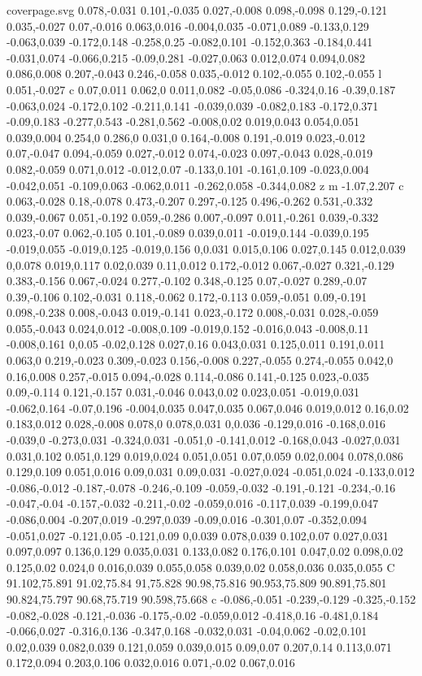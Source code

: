 \begin{filecontents}[noheader]{coverpage.svg}
0.078,-0.031 0.101,-0.035 0.027,-0.008 0.098,-0.098 0.129,-0.121 0.035,-0.027 0.07,-0.016 0.063,0.016 -0.004,0.035 -0.071,0.089 -0.133,0.129 -0.063,0.039 -0.172,0.148 -0.258,0.25 -0.082,0.101 -0.152,0.363 -0.184,0.441 -0.031,0.074 -0.066,0.215 -0.09,0.281 -0.027,0.063 0.012,0.074 0.094,0.082 0.086,0.008 0.207,-0.043 0.246,-0.058 0.035,-0.012 0.102,-0.055 0.102,-0.055 l 0.051,-0.027 c 0.07,0.011 0.062,0 0.011,0.082 -0.05,0.086 -0.324,0.16 -0.39,0.187 -0.063,0.024 -0.172,0.102 -0.211,0.141 -0.039,0.039 -0.082,0.183 -0.172,0.371 -0.09,0.183 -0.277,0.543 -0.281,0.562 -0.008,0.02 0.019,0.043 0.054,0.051 0.039,0.004 0.254,0 0.286,0 0.031,0 0.164,-0.008 0.191,-0.019 0.023,-0.012 0.07,-0.047 0.094,-0.059 0.027,-0.012 0.074,-0.023 0.097,-0.043 0.028,-0.019 0.082,-0.059 0.071,0.012 -0.012,0.07 -0.133,0.101 -0.161,0.109 -0.023,0.004 -0.042,0.051 -0.109,0.063 -0.062,0.011 -0.262,0.058 -0.344,0.082 z m -1.07,2.207 c 0.063,-0.028 0.18,-0.078 0.473,-0.207 0.297,-0.125 0.496,-0.262 0.531,-0.332 0.039,-0.067 0.051,-0.192 0.059,-0.286 0.007,-0.097 0.011,-0.261 0.039,-0.332 0.023,-0.07 0.062,-0.105 0.101,-0.089 0.039,0.011 -0.019,0.144 -0.039,0.195 -0.019,0.055 -0.019,0.125 -0.019,0.156 0,0.031 0.015,0.106 0.027,0.145 0.012,0.039 0,0.078 0.019,0.117 0.02,0.039 0.11,0.012 0.172,-0.012 0.067,-0.027 0.321,-0.129 0.383,-0.156 0.067,-0.024 0.277,-0.102 0.348,-0.125 0.07,-0.027 0.289,-0.07 0.39,-0.106 0.102,-0.031 0.118,-0.062 0.172,-0.113 0.059,-0.051 0.09,-0.191 0.098,-0.238 0.008,-0.043 0.019,-0.141 0.023,-0.172 0.008,-0.031 0.028,-0.059 0.055,-0.043 0.024,0.012 -0.008,0.109 -0.019,0.152 -0.016,0.043 -0.008,0.11 -0.008,0.161 0,0.05 -0.02,0.128 0.027,0.16 0.043,0.031 0.125,0.011 0.191,0.011 0.063,0 0.219,-0.023 0.309,-0.023 0.156,-0.008 0.227,-0.055 0.274,-0.055 0.042,0 0.16,0.008 0.257,-0.015 0.094,-0.028 0.114,-0.086 0.141,-0.125 0.023,-0.035 0.09,-0.114 0.121,-0.157 0.031,-0.046 0.043,0.02 0.023,0.051 -0.019,0.031 -0.062,0.164 -0.07,0.196 -0.004,0.035 0.047,0.035 0.067,0.046 0.019,0.012 0.16,0.02 0.183,0.012 0.028,-0.008 0.078,0 0.078,0.031 0,0.036 -0.129,0.016 -0.168,0.016 -0.039,0 -0.273,0.031 -0.324,0.031 -0.051,0 -0.141,0.012 -0.168,0.043 -0.027,0.031 0.031,0.102 0.051,0.129 0.019,0.024 0.051,0.051 0.07,0.059 0.02,0.004 0.078,0.086 0.129,0.109 0.051,0.016 0.09,0.031 0.09,0.031 -0.027,0.024 -0.051,0.024 -0.133,0.012 -0.086,-0.012 -0.187,-0.078 -0.246,-0.109 -0.059,-0.032 -0.191,-0.121 -0.234,-0.16 -0.047,-0.04 -0.157,-0.032 -0.211,-0.02 -0.059,0.016 -0.117,0.039 -0.199,0.047 -0.086,0.004 -0.207,0.019 -0.297,0.039 -0.09,0.016 -0.301,0.07 -0.352,0.094 -0.051,0.027 -0.121,0.05 -0.121,0.09 0,0.039 0.078,0.039 0.102,0.07 0.027,0.031 0.097,0.097 0.136,0.129 0.035,0.031 0.133,0.082 0.176,0.101 0.047,0.02 0.098,0.02 0.125,0.02 0.024,0 0.016,0.039 0.055,0.058 0.039,0.02 0.058,0.036 0.035,0.055 C 91.102,75.891 91.02,75.84 91,75.828 90.98,75.816 90.953,75.809 90.891,75.801 90.824,75.797 90.68,75.719 90.598,75.668 c -0.086,-0.051 -0.239,-0.129 -0.325,-0.152 -0.082,-0.028 -0.121,-0.036 -0.175,-0.02 -0.059,0.012 -0.418,0.16 -0.481,0.184 -0.066,0.027 -0.316,0.136 -0.347,0.168 -0.032,0.031 -0.04,0.062 -0.02,0.101 0.02,0.039 0.082,0.039 0.121,0.059 0.039,0.015 0.09,0.07 0.207,0.14 0.113,0.071 0.172,0.094 0.203,0.106 0.032,0.016 0.071,-0.02 0.067,0.016 
\end{filecontents}
